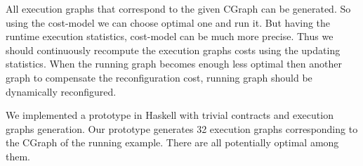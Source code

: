 All execution graphs that correspond to the given CGraph can be generated.
So using the cost-model we can choose optimal one and run it.
But having the runtime execution statistics, cost-model can be much more precise.
Thus we should continuously recompute the execution graphs costs using the updating statistics.
When the running graph becomes enough less optimal then another graph to compensate the reconfiguration cost, running graph should be dynamically reconfigured.

We implemented a prototype in Haskell with trivial contracts and execution graphs generation.
Our prototype generates 32 execution graphs corresponding to the CGraph of the running example.
There are all potentially optimal among them.








